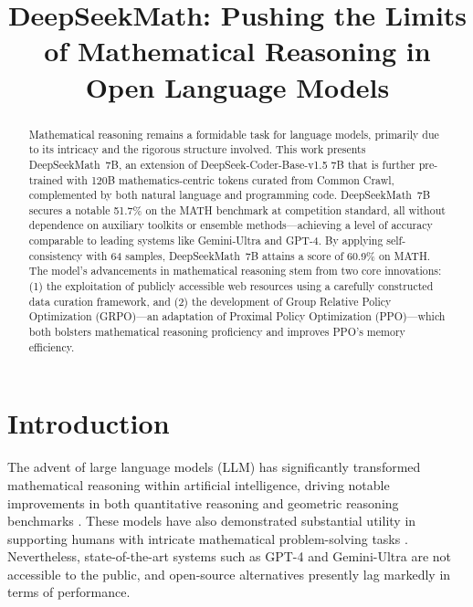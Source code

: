 \title{DeepSeekMath: Pushing the Limits of Mathematical Reasoning in Open Language Models}

\begin{abstract}
Mathematical reasoning remains a formidable task for language models, primarily due to its intricacy and the rigorous structure involved. This work presents DeepSeekMath~7B, an extension of DeepSeek-Coder-Base-v1.5 7B that is further pre-trained with 120B mathematics-centric tokens curated from Common Crawl, complemented by both natural language and programming code. DeepSeekMath~7B secures a notable 51.7\% on the MATH benchmark at competition standard, all without dependence on auxiliary toolkits or ensemble methods—achieving a level of accuracy comparable to leading systems like Gemini-Ultra and GPT-4. By applying self-consistency with 64 samples, DeepSeekMath~7B attains a score of 60.9\% on MATH. The model’s advancements in mathematical reasoning stem from two core innovations: (1) the exploitation of publicly accessible web resources using a carefully constructed data curation framework, and (2) the development of Group Relative Policy Optimization (GRPO)—an adaptation of Proximal Policy Optimization (PPO)—which both bolsters mathematical reasoning proficiency and improves PPO’s memory efficiency.
\end{abstract}

\section{Introduction}

The advent of large language models (LLM) has significantly transformed mathematical reasoning within artificial intelligence, driving notable improvements in both quantitative reasoning \citep{MATH} and geometric reasoning benchmarks \citep{trinh2024solving}. These models have also demonstrated substantial utility in supporting humans with intricate mathematical problem-solving tasks \citep{tao}. Nevertheless, state-of-the-art systems such as GPT-4 \citep{gpt4} and Gemini-Ultra \citep{gemini} are not accessible to the public, and open-source alternatives presently lag markedly in terms of performance.

